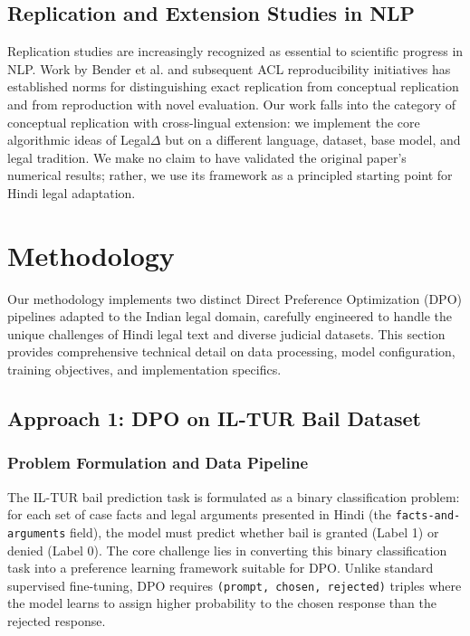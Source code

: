 \documentclass[conference]{IEEEtran}
\begin{document}
\subsection{Replication and Extension Studies in NLP}
Replication studies are increasingly recognized as essential to scientific progress in NLP. Work by Bender et al. and subsequent ACL reproducibility initiatives has established norms for distinguishing exact replication from conceptual replication and from reproduction with novel evaluation. Our work falls into the category of conceptual replication with cross-lingual extension: we implement the core algorithmic ideas of Legal$\Delta$ but on a different language, dataset, base model, and legal tradition. We make no claim to have validated the original paper's numerical results; rather, we use its framework as a principled starting point for Hindi legal adaptation.

\section{Methodology}
Our methodology implements two distinct Direct Preference Optimization (DPO) pipelines adapted to the Indian legal domain, carefully engineered to handle the unique challenges of Hindi legal text and diverse judicial datasets. This section provides comprehensive technical detail on data processing, model configuration, training objectives, and implementation specifics.

\subsection{Approach 1: DPO on IL-TUR Bail Dataset}

\subsubsection{Problem Formulation and Data Pipeline}
The IL-TUR bail prediction task is formulated as a binary classification problem: for each set of case facts and legal arguments presented in Hindi (the \texttt{facts-and-arguments} field), the model must predict whether bail is granted (Label 1) or denied (Label 0). The core challenge lies in converting this binary classification task into a preference learning framework suitable for DPO. Unlike standard supervised fine-tuning, DPO requires \texttt{(prompt, chosen, rejected)} triples where the model learns to assign higher probability to the chosen response than the rejected response.
\end{document}
